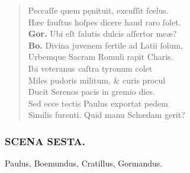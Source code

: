 \documentclass[a4paper,12pt]{article}
\begin{document}
\begin{verse}
Peccaſſe quem pęnituit, excuſſit ſcelus.\\[0pt]
Hæc fauſtus hoſpes dicere haud raro ſolet.\\[0pt]
\textbf{Gor.} Ubi eſt ſalutis dulcis aſſertor meæ?\\[0pt]
\textbf{Bo.} Divina juvenem fertile ad Latii ſolum,\\[0pt]
Urbemque Sacram Romuli rapit Charis.\\[0pt]
Ibi veteranus caſtra tyronum colet\\[0pt]
Miles pudoris militum, \& curis procul\\[0pt]
Ducit Serenos pacis in gremio dies.\\[0pt]
Sed ecce tectis Paulus exportat pedem\\[0pt]
Similis furenti. Quid manu Schædam gerit?\\[0pt]
\end{verse}
\subsubsection{SCENA SESTA.}
\label{sec:org88eeee1}

Paulus, Boemundus, Cratillus, Gormandus.
\end{document}
